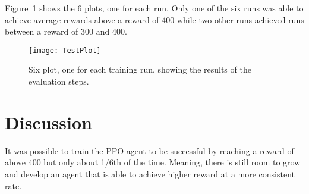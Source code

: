 Figure~\ref{fig:validation_runs} shows the 6 plots, one for each run. Only one of the six runs was able to achieve average rewards above a reward of 400 while two other runs achieved runs between a reward of 300 and 400. 

\begin{figure}
	\centering
	\texttt{[image: TestPlot]}
	\caption{Six plot, one for each training run, showing the results of the evaluation steps.}
	\label{fig:validation_runs}
\end{figure}

\section{Discussion}

It was possible to train the PPO agent to be successful by reaching a reward of above 400 but only about 1/6th of the time. Meaning, there is still room to grow and develop an agent that is able to achieve higher reward at a more consistent rate. 